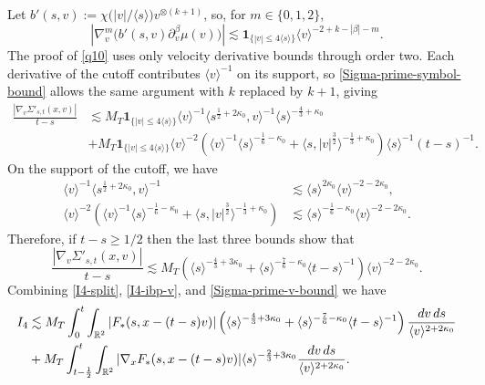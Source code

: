 \documentclass[reqno,11pt]{amsart}
\numberwithin{equation}{section}
\begin{document}
	Let $b'(s,v):=\chi\big(|v|/\langle s\rangle\big)v^{\otimes(k+1)}$, so, for $m\in\{0,1,2\}$,
	\begin{equation}
		\left|
		\nabla_v^m\bigl(b'(s,v)\partial_v^\beta\mu(v)\bigr)
		\right|
		\lesssim\mathbf 1_{\{|v|\leq4\langle s\rangle\}}\langle v\rangle^{-2+k-|\beta|-m}.
		\label{Sigma-prime-symbol-bound}
	\end{equation}
The proof of \eqref{q10} uses only velocity derivative
bounds through order two. Each derivative of the cutoff contributes
$\langle v\rangle^{-1}$ on its support, so \eqref{Sigma-prime-symbol-bound}
allows the same argument with $k$ replaced by $k+1$, giving
	\begin{align*}
		\frac{|\nabla_v\Sigma'_{s,t}(x,v)|}{t-s}&\lesssim M_T\mathbf 1_{\{|v|\leq4\langle s\rangle\}}
		\langle v\rangle^{-1}\langle s^{\frac12+2\kappa_0},v\rangle^{-1}
		\langle s\rangle^{-\frac43+\kappa_0}\\
		&+M_T\mathbf 1_{\{|v|\leq4\langle s\rangle\}}\langle v\rangle^{-2}\left(
		\langle v\rangle^{-1}\langle s\rangle^{-\frac16-\kappa_0}+
		\langle s,|v|^{\frac32}\rangle^{-\frac13+\kappa_0}\right)
		\langle s\rangle^{-1}(t-s)^{-1}.
	\end{align*}
	On the support of the cutoff, we have
	\begin{align*}
		\langle v\rangle^{-1}
		\langle s^{\frac12+2\kappa_0},v\rangle^{-1}&\lesssim
		\langle s\rangle^{2\kappa_0}
		\langle v\rangle^{-2-2\kappa_0},\\
		\langle v\rangle^{-2}\left(
		\langle v\rangle^{-1}\langle s\rangle^{-\frac16-\kappa_0}+
		\langle s,|v|^{\frac32}\rangle^{-\frac13+\kappa_0}\right)
		&\lesssim
		\langle s\rangle^{-\frac16-\kappa_0}
		\langle v\rangle^{-2-2\kappa_0}.
	\end{align*}
	Therefore, if $t-s\geq1/2$ then the last three bounds show that
	\begin{equation}
		\frac{|\nabla_v\Sigma'_{s,t}(x,v)|}{t-s}
		\lesssim
		M_T\left(
		\langle s\rangle^{-\frac43+3\kappa_0}
		+
		\langle s\rangle^{-\frac76-\kappa_0}
		\langle t-s\rangle^{-1}
		\right)
		\langle v\rangle^{-2-2\kappa_0}.
		\label{Sigma-prime-v-bound}
	\end{equation}
	Combining \eqref{I4-split}, \eqref{I4-ibp-v}, and \eqref{Sigma-prime-v-bound} we have
	\begin{align}
		I_4&\lesssim
		M_T\int_0^t\int_{\mathbb R^2}|F_*(s,x-(t-s)v)|
		\left(\langle s\rangle^{-\frac43+3\kappa_0}+
		\langle s\rangle^{-\frac76-\kappa_0}
		\langle t-s\rangle^{-1}\right)
		\frac{dv\,ds}{\langle v\rangle^{2+2\kappa_0}}
		\notag\\
		&+M_T\int_{t-\frac12}^t\int_{\mathbb R^2}
		|\nabla_xF_*(s,x-(t-s)v)|
		\langle s\rangle^{-\frac23+3\kappa_0}
		\frac{dv\,ds}{\langle v\rangle^{2+2\kappa_0}}.
		\label{I4-improved}
	\end{align}
	
\end{document}
